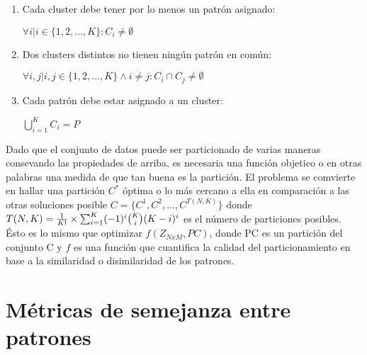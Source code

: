 \begin{enumerate} \label{en:properties}

\item Cada cluster debe tener por lo menos un patr\'on asignado:

$\forall i | i \in \{1, 2, \dots, K\} : C_i \neq \emptyset$

\item Dos clusters distintos no tienen ning\'un patr\'on en com\'un:

$\forall i,j | i,j\in \{1, 2, \dots, K\} \land i \neq j:  C_i \cap C_j \neq \emptyset$

\item Cada patr\'on debe estar asignado a un cluster:

$\bigcup_{i=1}^{K} C_i = P$

\end{enumerate}

Dado que el conjunto de datos puede ser particionado de varias maneras
consevando las propiedades de arriba, es necesaria una función objetico o en otras palabras
una medida de que tan buena es la partici\'on. El problema se comvierte en hallar
una partici\'on $C^*$  \'optima o lo m\'as cercano a ella en comparaci\'on a 
las otras soluciones posible $C = \{ C^1, C^2, \dots, C^{T(N,K)} \}$ donde 
$T(N,K) = { {1 \over K!} \times {\sum_{i=1}^{K} (-1)^i  \binom{K}{i} (K-i)^i} }$
es el n\'umero de particiones posibles. \'Esto es lo mismo que optimizar $f(Z_{NxM}, PC)$,
donde PC es un partici\'on del conjunto C y $f$ es una funci\'on que
cuantifica la calidad del particionamiento en base a la similaridad o disimilaridad
de los patrones.

\section{M\'etricas de semejanza entre patrones} \label{sect:mdist}

